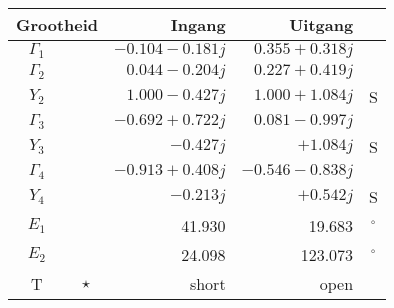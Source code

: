 \begin{tabular}{|cc|r|r|c|} 
\hline \multicolumn{2}{|c|}{\textbf{Grootheid}} & \textbf{Ingang} & \textbf{Uitgang} & \\ 
\hline $\Gamma_1$ & \color{blue}{$\star$} & $-0.104 -0.181 j$ & $0.355 +0.318 j$ &  \\ 
\hline $\Gamma_2$ & \color{green}{$\star$} & $0.044 -0.204 j$ & $0.227 +0.419 j$ &  \\ 
$Y_2$ & \color{green}{$\star$} & $1.000 -0.427 j$ & $1.000 +1.084 j$ & S \\ 
\hline $\Gamma_3$ & \color{cyan}{$\star$} & $-0.692 +0.722 j$ & $0.081 -0.997 j$ &  \\ 
$Y_3$ & \color{cyan}{$\star$} & $-0.427 j$ & $+1.084 j$ & S \\ 
\hline $\Gamma_4$ & \color{magenta}{$\star$} & $-0.913 +0.408 j$ & $-0.546 -0.838 j$ &  \\ 
$Y_4$ & \color{magenta}{$\star$} & $-0.213 j$ & $+0.542 j$ & S \\ 
\hline $E_1$ & \color{blue}{\textbf{--}} & 41.930 & 19.683 & $^{\circ}$ \\ 
\hline $E_2$ & \color{magenta}{\textbf{--}} & 24.098 & 123.073 & $^{\circ}$ \\ 
\hline T & $\star$ & short & open &  \\ 
\hline \end{tabular} 
